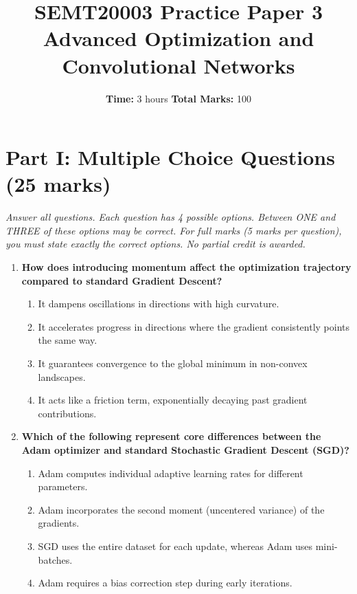 \documentclass[11pt]{article}
\title{\textbf{SEMT20003 Practice Paper 3}\\ Advanced Optimization and Convolutional Networks}
\author{}
\date{\textbf{Time:} 3 hours \quad \textbf{Total Marks:} 100}
\begin{document}
\maketitle

\section*{Part I: Multiple Choice Questions (25 marks)}
\textit{Answer all questions. Each question has 4 possible options. Between ONE and THREE of these options may be correct. For full marks (5 marks per question), you must state exactly the correct options. No partial credit is awarded.}

\begin{enumerate}
    \item \textbf{How does introducing momentum affect the optimization trajectory compared to standard Gradient Descent?}
    \begin{enumerate}
        \item[A)] It dampens oscillations in directions with high curvature.
        \item[B)] It accelerates progress in directions where the gradient consistently points the same way.
        \item[C)] It guarantees convergence to the global minimum in non-convex landscapes.
        \item[D)] It acts like a friction term, exponentially decaying past gradient contributions.
    \end{enumerate}
    \vspace{0.5cm}

    \item \textbf{Which of the following represent core differences between the Adam optimizer and standard Stochastic Gradient Descent (SGD)?}
    \begin{enumerate}
        \item[A)] Adam computes individual adaptive learning rates for different parameters.
        \item[B)] Adam incorporates the second moment (uncentered variance) of the gradients.
        \item[C)] SGD uses the entire dataset for each update, whereas Adam uses mini-batches.
        \item[D)] Adam requires a bias correction step during early iterations.
    \end{enumerate}
    \vspace{0.5cm}


\end{enumerate}
\end{document}
